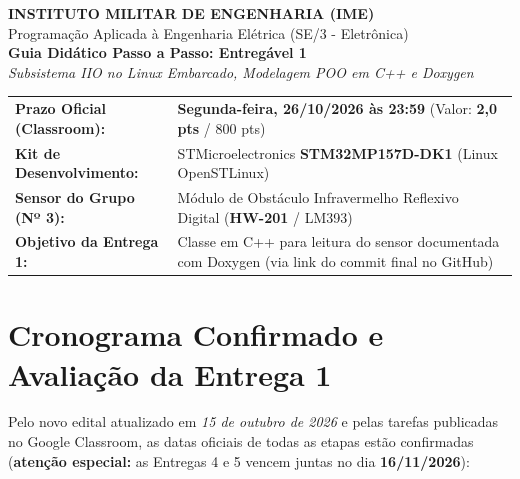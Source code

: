 \documentclass[11pt,a4paper]{article}
\begin{document}
\begin{center}
    {\Large \textbf{INSTITUTO MILITAR DE ENGENHARIA (IME)}}\\[0.15cm]
    {\large Programação Aplicada à Engenharia Elétrica (SE/3 - Eletrônica)}\\[0.1cm]
    {\Large \textbf{Guia Didático Passo a Passo: Entregável 1}}\\[0.1cm]
    {\normalsize \textit{Subsistema IIO no Linux Embarcado, Modelagem POO em C++ e Doxygen}}\\[0.3cm]
    \begin{tabular}{lp{10.5cm}}
        \toprule
        \textbf{Prazo Oficial (Classroom):} & \textbf{Segunda-feira, 26/10/2026 às 23:59} (Valor: \textbf{2,0 pts} / 800 pts) \\
        \textbf{Kit de Desenvolvimento:} & STMicroelectronics \textbf{STM32MP157D-DK1} (Linux OpenSTLinux) \\
        \textbf{Sensor do Grupo (Nº 3):} & Módulo de Obstáculo Infravermelho Reflexivo Digital (\textbf{HW-201} / LM393) \\
        \textbf{Objetivo da Entrega 1:} & Classe em C++ para leitura do sensor documentada com Doxygen (via link do commit final no GitHub) \\
        \bottomrule
    \end{tabular}
\end{center}

\vspace{0.2cm}

\section{Cronograma Confirmado e Avaliação da Entrega 1}

Pelo novo edital atualizado em \textit{15 de outubro de 2026} e pelas tarefas publicadas no Google Classroom, as datas oficiais de todas as etapas estão confirmadas (\textbf{atenção especial:} as Entregas 4 e 5 vencem juntas no dia \textbf{16/11/2026}):
\end{document}
